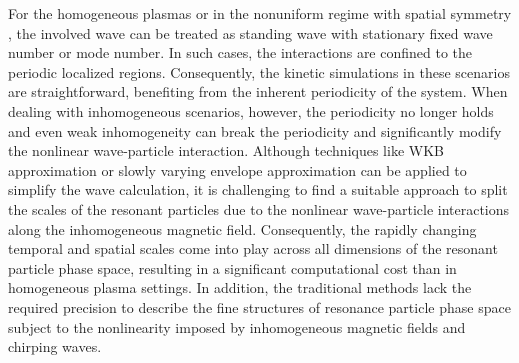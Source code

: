 For the homogeneous plasmas \cite{lilley2009,breizman2010} or in the nonuniform regime with spatial symmetry \cite{hezaveh2017,hezaveh2020,hezaveh2021}, 
the involved wave can be treated as  standing wave with stationary fixed wave number or mode number. 
In such cases, the interactions are confined to the periodic localized regions. Consequently, the kinetic simulations in these scenarios are straightforward, benefiting from the inherent periodicity of the system. 
When dealing with inhomogeneous scenarios, however, 
the periodicity no longer holds
and even weak inhomogeneity can break the periodicity and significantly modify the nonlinear wave-particle interaction.
Although  techniques like WKB approximation \cite{wkb} or slowly varying envelope approximation \cite{svap} can be applied to simplify the wave calculation, it is challenging to find a suitable approach to split the scales of the resonant particles due to the nonlinear wave-particle interactions along the inhomogeneous magnetic field.
Consequently, the rapidly changing temporal and spatial scales come into play across all dimensions of the resonant particle phase space, resulting in a significant computational cost than in homogeneous plasma settings.
In addition, the traditional methods lack the required precision to describe  the fine structures of resonance particle phase space
subject to the nonlinearity imposed by inhomogeneous magnetic fields and chirping waves.

